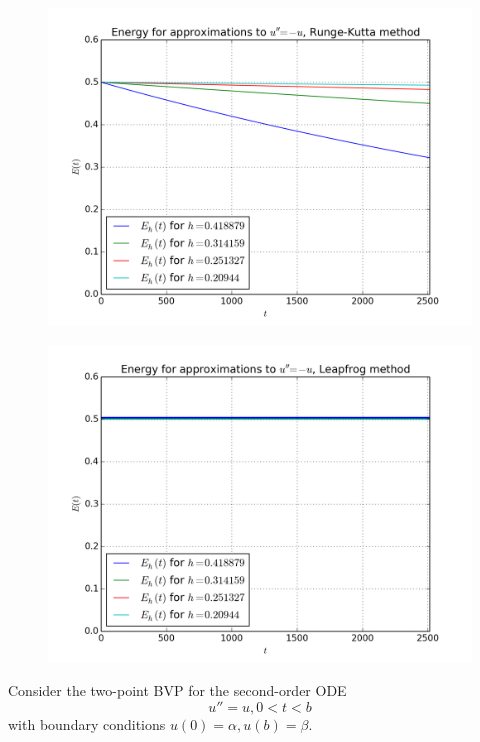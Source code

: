 \documentclass[10pt]{article}
\begin{document}
\begin{itemize}
\begin{figure}[H]
  \centering
    \includegraphics[scale=0.6]{energy_runge-kutta}
\end{figure}

\begin{figure}[H]
  \centering
    \includegraphics[scale=0.6]{energy_leapfrog}
\end{figure}

\end{itemize}

\newpage


Consider the two-point BVP for the second-order ODE $$
u'' = u, 0 < t < b
$$ with boundary conditions $ u(0) = \alpha, u(b) = \beta $. 
\end{document}
